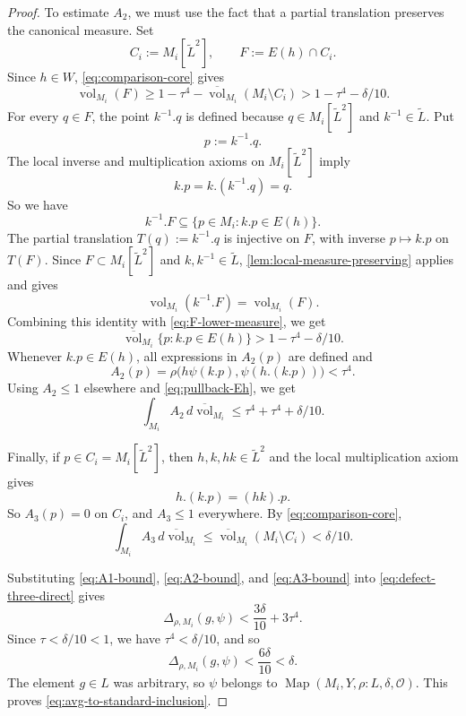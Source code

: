 \documentclass[12pt]{amsart}
\theoremstyle{definition}
\newcommand{\vol}{\operatorname{vol}}
\newcommand{\Map}{\operatorname{Map}}
\newcommand{\cO}{\mathcal O}
\newcommand{\1}{\mathbf 1}
\newcommand{\dbar}{\overline{\vol}}
\begin{document}
\begin{proof}
To estimate $A_2$, we must use the fact that a partial translation preserves the canonical measure. Set
\[
 C_i:=M_i[\widetilde L^2],
 \qquad F:=E(h)\cap C_i.
\]
Since $h\in W$, \eqref{eq:comparison-core} gives
\begin{equation}\label{eq:F-lower-measure}
 \dbar_{M_i}(F)
 \geq1-\tau^4-\dbar_{M_i}(M_i\setminus C_i)
 >1-\tau^4-\delta/10.
\end{equation}
For every $q\in F$, the point $k^{-1}.q$ is defined because $q\in M_i[\widetilde L^2]$ and $k^{-1}\in\widetilde L$. Put
\[
 p:=k^{-1}.q.
\]
The local inverse and multiplication axioms on $M_i[\widetilde L^2]$ imply
\[
 k.p=k.(k^{-1}.q)=q.
\]
So we have
\[
 k^{-1}.F\subseteq\{p\in M_i:k.p\in E(h)\}.
\]
The partial translation $T(q):=k^{-1}.q$ is injective on $F$, with inverse $p\mapsto k.p$ on $T(F)$. Since $F\subset M_i[\widetilde L^2]$ and $k,k^{-1}\in\widetilde L$, \cref{lem:local-measure-preserving} applies and gives
\[
 \vol_{M_i}(k^{-1}.F)=\vol_{M_i}(F).
\]
Combining this identity with \eqref{eq:F-lower-measure}, we get
\begin{equation}\label{eq:pullback-Eh}
 \dbar_{M_i}\{p:k.p\in E(h)\}
 >1-\tau^4-\delta/10.
\end{equation}
Whenever $k.p\in E(h)$, all expressions in $A_2(p)$ are defined and
\[
 A_2(p)=\rho\bigl(h\psi(k.p),\psi(h.(k.p))\bigr)<\tau^4.
\]
Using $A_2\leq1$ elsewhere and \eqref{eq:pullback-Eh}, we get
\begin{equation}\label{eq:A2-bound}
 \int_{M_i}A_2\,d\dbar_{M_i}
 \leq \tau^4+\tau^4+\delta/10.
\end{equation}

Finally, if $p\in C_i=M_i[\widetilde L^2]$, then $h,k,hk\in\widetilde L^2$ and the local multiplication axiom gives
\[
 h.(k.p)=(hk).p.
\]
So $A_3(p)=0$ on $C_i$, and $A_3\leq1$ everywhere. By \eqref{eq:comparison-core},
\begin{equation}\label{eq:A3-bound}
 \int_{M_i}A_3\,d\dbar_{M_i}
 \leq\dbar_{M_i}(M_i\setminus C_i)<\delta/10.
\end{equation}

Substituting \eqref{eq:A1-bound}, \eqref{eq:A2-bound}, and \eqref{eq:A3-bound} into \eqref{eq:defect-three-direct} gives
\[
 \Delta_{\rho,M_i}(g,\psi)
 <\frac{3\delta}{10}+3\tau^4.
\]
Since $\tau<\delta/10<1$, we have $\tau^4<\delta/10$, and so
\[
 \Delta_{\rho,M_i}(g,\psi)<\frac{6\delta}{10}<\delta.
\]
The element $g\in L$ was arbitrary, so $\psi$ belongs to
$\Map(M_i,Y,\rho:L,\delta,\cO)$. This proves \eqref{eq:avg-to-standard-inclusion}.


\end{proof}
\end{document}
